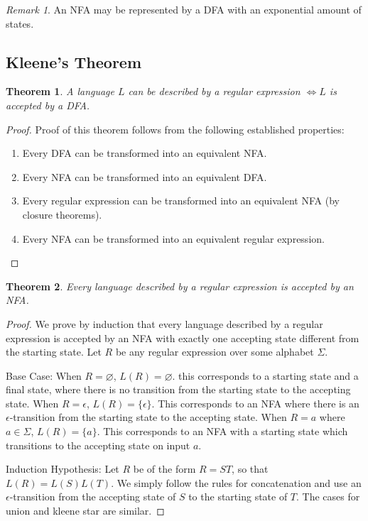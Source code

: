 \documentclass[11pt]{article}
\let\emptyset\varnothing
\theoremstyle{plain} %
\newtheorem*{theorem}{Theorem}
\theoremstyle{definition}
\theoremstyle{example}
\theoremstyle{remark}
\newtheorem*{remark}{Remark}
\begin{document}
\begin{remark}
An NFA may be represented by a DFA with an exponential amount of states.
\end{remark}

\subsection{Kleene's Theorem}

\begin{theorem}
A language $L$ can be described by a regular expression $\iff L$ is accepted by a DFA.
\end{theorem}

\begin{proof}
Proof of this theorem follows from the following established properties:
\begin{enumerate}
	\item Every DFA can be transformed into an equivalent NFA.
	\item Every NFA can be transformed into an equivalent DFA.
	\item Every regular expression can be transformed into an equivalent NFA (by closure theorems).
	\item Every NFA can be transformed into an equivalent regular expression.
\end{enumerate}

\end{proof}


\begin{theorem}
Every language described by a regular expression is accepted by an NFA.
\end{theorem}

\begin{proof}
	We prove by induction that every language described by a regular expression is accepted by an NFA with exactly one accepting state different from the starting state. Let $R$ be any regular expression over some alphabet $\Sigma$. 
	
	Base Case: When $R = \emptyset$, $L(R) = \emptyset$. this corresponds to a starting state and a final state, where there is no transition from the starting state to the accepting state. When $R = \epsilon$, $L(R) = \{\epsilon\}$. This corresponds to an NFA where there is an $\epsilon$-transition from the starting state to the accepting state. When $R = a$ where $a \in \Sigma$, $L(R) = \{a\}$. This corresponds to an NFA with a starting state which transitions to the accepting state on input $a$.

	Induction Hypothesis: Let $R$ be of the form $R = ST$, so that $L(R) = L(S)L(T)$. We simply follow the rules for concatenation and use an $\epsilon$-transition from the accepting state of $S$ to the starting state of $T$. The cases for union and kleene star are similar. 
\end{proof}
\end{document}
